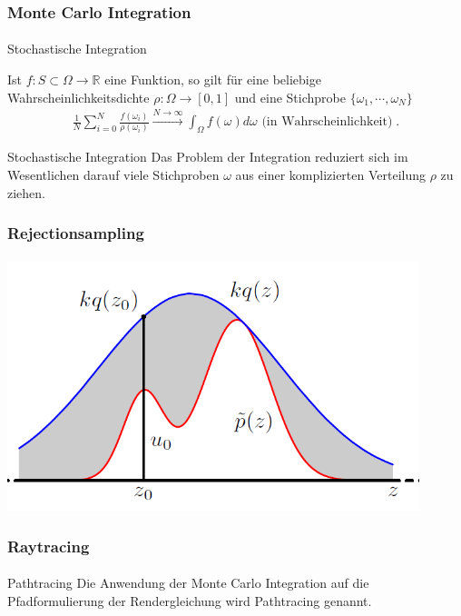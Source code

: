 \documentclass{beamer}
\begin{document}
\begin{frame}
    \frametitle{Monte Carlo Integration}
\framesubtitle{}
\begin{block}{Stochastische Integration}

Ist $f: S \subset \Omega \to \mathbb{R}$ eine Funktion, so gilt für eine beliebige Wahrscheinlichkeitsdichte  $\rho: \Omega \to [0,1]$ und eine Stichprobe 
 $\{ \omega_1, \cdots, \omega_N \}$
\begin{align}
\frac{1}{N} \sum_{i= 0}^{N}  \frac{f(\omega_i)}{\rho(\omega_i)} \xrightarrow{ N \to \infty } \int_{\Omega} f(\omega) d\omega \text{ (in Wahrscheinlichkeit)} \; .
\end{align}
\end{block}

\begin{block}{Stochastische Integration}
Das Problem der Integration reduziert sich im Wesentlichen darauf viele Stichproben $\omega$ aus einer komplizierten  Verteilung  $\rho$ zu ziehen.
\end{block}

\end{frame}

\begin{frame}
    \frametitle{Rejectionsampling}
\framesubtitle{}

  \begin{center}
    \includegraphics[width=0.9\textwidth]{images/rjsampling2}
\end{center}

\end{frame}



\begin{frame}
    \frametitle{Raytracing}
\framesubtitle{}
\begin{block}{Pathtracing}
Die Anwendung der Monte Carlo Integration auf die Pfadformulierung der Rendergleichung wird Pathtracing genannt.
\end{block}
\end{frame}
\end{document}
